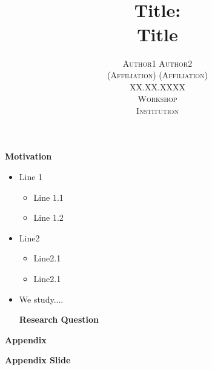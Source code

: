 \documentclass[handout, 9pt]{beamer}
\title{\vspace{0.1cm}\\
\huge \textbf{Title:\\
Title}}
\author{\small \textsc{Author1 \hspace{1.8cm} Author2
\vspace{0.1cm}\\
(Affiliation) \hspace{1cm} (Affiliation)} 
\vspace{2cm}\\
\textsc{XX.XX.XXXX}
\vspace{0.1cm}\\
\textsc{Workshop}
\vspace{0.1cm}\\
\textsc{Institution}}
\date{}
\begin{document}
\maketitle


\begin{frame}{\textbf{Motivation} 
\hspace{9.3cm}
\hyperlink{A1}{}}
\label{Motivation}
\vspace{0.6cm}
\begin{itemize}
\item Line 1
\vspace{0.25cm}
\begin{itemize}\setlength\itemsep{0.7em}
\item Line 1.1 
\item Line 1.2
\end{itemize}

\vspace{0.6cm}

\item Line2 
\vspace{0.25cm}
\begin{itemize}\setlength\itemsep{0.7em}
\item Line2.1
\item Line2.1
\end{itemize}

\vspace{0.6cm}

\item We study....

\vspace{0.6cm}

\textbf{Research Question}

\end{itemize}
\end{frame}

\begin{frame}
    \begin{center}
        \Huge \textbf{Appendix}
    \end{center}
\end{frame}

\begin{frame}{\textbf{Appendix Slide}
\hspace{7.3cm}
\hyperlink{Motivation}{}}
\label{A1}
    
\end{frame}
\end{document}
